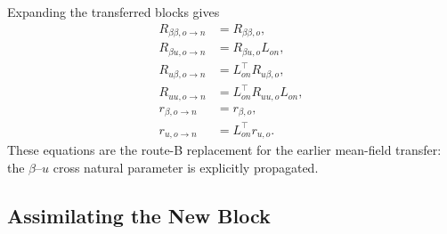 \documentclass[12pt]{article}
\begin{document}
Expanding the transferred blocks gives
\begin{align}
    R_{\beta\beta,o\rightarrow n}
    &=R_{\beta\beta,o},
    \label{eq:transfer_Rbb}\\
    R_{\beta u,o\rightarrow n}
    &=R_{\beta u,o}L_{on},
    \label{eq:transfer_Rbu}\\
    R_{u\beta,o\rightarrow n}
    &=L_{on}^\top R_{u\beta,o},
    \label{eq:transfer_Rub}\\
    R_{uu,o\rightarrow n}
    &=L_{on}^\top R_{uu,o}L_{on},
    \label{eq:transfer_Ruu}\\
    r_{\beta,o\rightarrow n}
    &=r_{\beta,o},
    \label{eq:transfer_rb}\\
    r_{u,o\rightarrow n}
    &=L_{on}^\top r_{u,o}.
    \label{eq:transfer_ru}
\end{align}
These equations are the route-B replacement for the earlier mean-field transfer: the
$\beta$--$u$ cross natural parameter is explicitly propagated.

\subsection{Assimilating the New Block}
\label{subsec:joint_new_block_assimilation}
\end{document}
